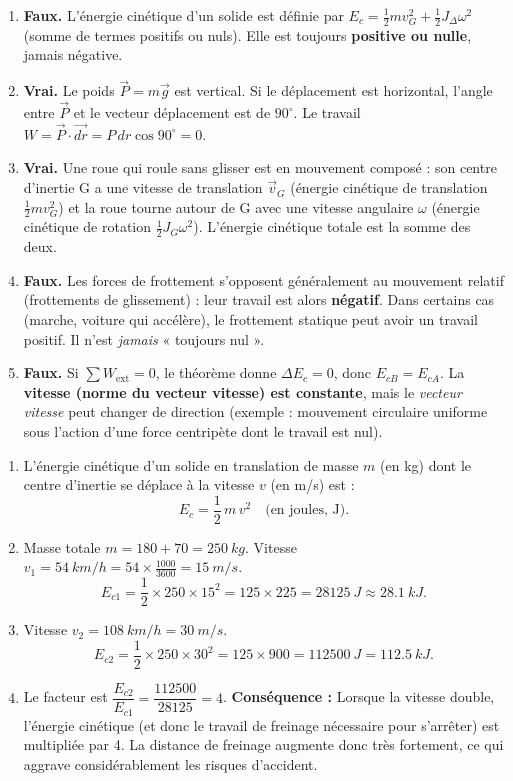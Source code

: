 \documentclass[11pt]{article}
\begin{document}
\begin{corrige}
\begin{enumerate}
\item \textbf{Faux.} L'énergie cinétique d'un solide est définie par $E_c = \frac{1}{2}mv_G^2 + \frac{1}{2}J_{\Delta}\omega^2$ (somme de termes positifs ou nuls). Elle est toujours \textbf{positive ou nulle}, jamais négative.
\item \textbf{Vrai.} Le poids $\vec{P}=m\vec{g}$ est vertical. Si le déplacement est horizontal, l'angle entre $\vec{P}$ et le vecteur déplacement est de $90^{\circ}$. Le travail $W = \vec{P}\cdot\vec{dr} = P\,dr\cos 90^{\circ} = 0$.
\item \textbf{Vrai.} Une roue qui roule sans glisser est en mouvement composé : son centre d'inertie G a une vitesse de translation $\vec{v}_G$ (énergie cinétique de translation $\frac{1}{2}mv_G^2$) et la roue tourne autour de G avec une vitesse angulaire $\omega$ (énergie cinétique de rotation $\frac{1}{2}J_G\omega^2$). L'énergie cinétique totale est la somme des deux.
\item \textbf{Faux.} Les forces de frottement s'opposent généralement au mouvement relatif (frottements de glissement) : leur travail est alors \textbf{négatif}. Dans certains cas (marche, voiture qui accélère), le frottement statique peut avoir un travail positif. Il n'est \emph{jamais} « toujours nul ».
\item \textbf{Faux.} Si $\sum W_{\text{ext}} = 0$, le théorème donne $\Delta E_c = 0$, donc $E_{cB}=E_{cA}$. La \textbf{vitesse (norme du vecteur vitesse) est constante}, mais le \emph{vecteur vitesse} peut changer de direction (exemple : mouvement circulaire uniforme sous l'action d'une force centripète dont le travail est nul).
\end{enumerate}
\end{corrige}

\begin{corrige}
\begin{enumerate}
\item L'énergie cinétique d'un solide en translation de masse $m$ (en kg) dont le centre d'inertie se déplace à la vitesse $v$ (en m/s) est :
\[
E_c = \frac{1}{2}\,m\,v^2 \quad \text{(en joules, J)}.
\]
\item Masse totale $m = 180 + 70 = \SI{250}{kg}$.
Vitesse $v_1 = \SI{54}{km/h} = 54 \times \frac{1000}{3600} = \SI{15}{m/s}$.
\[
E_{c1} = \frac{1}{2} \times 250 \times 15^2 = 125 \times 225 = \SI{28125}{J} \approx \SI{28,1}{kJ}.
\]
\item Vitesse $v_2 = \SI{108}{km/h} = \SI{30}{m/s}$.
\[
E_{c2} = \frac{1}{2} \times 250 \times 30^2 = 125 \times 900 = \SI{112500}{J} = \SI{112,5}{kJ}.
\]
\item Le facteur est $\dfrac{E_{c2}}{E_{c1}} = \dfrac{112500}{28125} = 4$.
\textbf{Conséquence :} Lorsque la vitesse double, l'énergie cinétique (et donc le travail de freinage nécessaire pour s'arrêter) est multipliée par 4. La distance de freinage augmente donc très fortement, ce qui aggrave considérablement les risques d'accident.
\end{enumerate}
\end{corrige}
\end{document}
